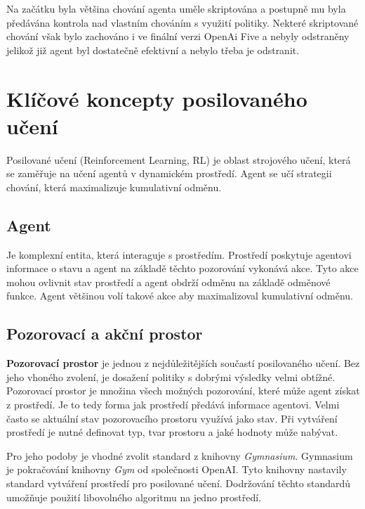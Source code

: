 Na začátku byla většina chování agenta uměle skriptována a postupně mu byla předávána kontrola nad vlastním chováním s využití politiky.
Nekteré skriptované chování však bylo zachováno i ve finální verzi OpenAi Five a nebyly odstraněny jelikož již agent byl dostatečně efektivní a nebylo třeba je odstranit.

\section{Klíčové koncepty posilovaného učení}\label{sec:klicove-koncepty-posilovaneho-uceni}
Posilované učení (Reinforcement Learning, RL) je oblast strojového učení, která se zaměřuje na učení agentů v dynamickém prostředí.
Agent se učí strategii chování, která maximalizuje kumulativní odměnu.

\subsection{Agent}\label{subsec:agent}

Je komplexní entita, která interaguje s prostředím.
Prostředí poskytuje agentovi informace o stavu a agent na základě těchto pozorování vykonává akce.
Tyto akce mohou ovlivnit stav prostředí a agent obdrží odměnu na základě odměnové funkce.
Agent většinou volí takové akce aby maximalizoval kumulativní odměnu.

\subsection{Pozorovací a akční prostor}
\label{subsec:prostory}

\textbf{Pozorovací prostor} je jednou z nejdůležitějších součastí posilovaného učení.
Bez jeho vhoného zvolení, je dosažení politiky s dobrými výsledky velmi obtížné.
Pozorovací prostor je množina všech možných pozorování, které může agent získat z prostředí.
Je to tedy forma jak prostředí předává informace agentovi.
Velmi často se aktuální stav pozorovacího prostoru využívá jako stav.
Při vytváření prostředí je nutné definovat typ, tvar prostoru a jaké hodnoty může nabývat.

Pro jeho podoby je vhodné zvolit standard z knihovny \emph{Gymnasium}\cite{Gymnasium}.
Gymnasium je pokračování knihovny \textit{Gym} od společnosti OpenAI.
Tyto knihovny nastavily standard vytváření prostředí pro posilované učení.
Dodržování těchto standardů umožňuje použití libovolného algoritmu na jedno prostředí.

\bigskip

